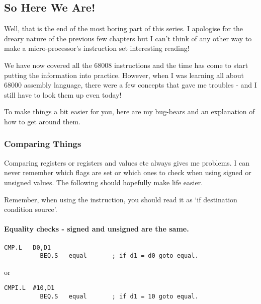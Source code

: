\subsection{So Here We Are!}
\label{ch5-summary}%

Well, that is the end of the most boring part of this series. I
      apologise for the dreary nature of the previous few chapters but I can't
      think of any other way to make a micro-{}processor's instruction set
      interesting reading!

We have now covered all the 68008 instructions and the time has
      come to start putting the information into practice. However, when I was
      learning all about 68000 assembly language, there were a few concepts
      that gave me troubles -{} and I still have to look them up even today!

To make things a bit easier for you, here are my bug-{}bears and an
      explanation of how to get around them.

\subsubsection{Comparing Things}
\label{ch5-comparing}%

Comparing registers or registers and values etc always gives me
        problems. I can never remember which flags are set or which ones to
        check when using signed or unsigned values. The following should
        hopefully make life easier.

Remember, when using the  instruction, you should read it as
        `if destination condition source'.

\paragraph{Equality checks -{} signed and unsigned are the same.}

\begin{lstlisting}[firstnumber=1,]
          CMP.L   D0,D1
          BEQ.S   equal       ; if d1 = d0 goto equal.
\end{lstlisting}

or

\begin{lstlisting}[firstnumber=1,]
          CMPI.L  #10,D1
          BEQ.S   equal       ; if d1 = 10 goto equal.
\end{lstlisting}

